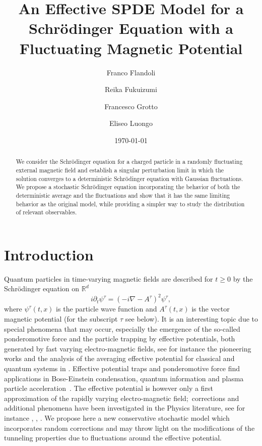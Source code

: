 \documentclass[a4paper,10pt]{amsart}
\title[Effective Models for Schr\"odinger Equations]{An Effective SPDE Model for a Schr\"odinger Equation with a Fluctuating Magnetic Potential}
\author[F. Flandoli]{Franco Flandoli}
\author[R. Fukuizumi]{Reika Fukuizumi}
\author[F. Grotto]{Francesco Grotto}
\author[E. Luongo]{Eliseo Luongo}
\date\today
\newcommand{\R}{\mathbb{R}}
\theoremstyle{remark}
\numberwithin{equation}{section}
\begin{document}
\begin{abstract}
    We consider the Schr\"odinger equation for a charged particle in a randomly fluctuating external magnetic field and establish a singular perturbation limit in which the solution converges to a deterministic Schr\"odinger equation with Gaussian fluctuations. We propose a stochastic Schr\"odinger equation incorporating the behavior of both the deterministic average and the fluctuations and show that it has the same limiting behavior as the original model, while providing a simpler way to study the distribution of relevant observables.
\end{abstract}

\maketitle

\section{Introduction}\label{sec:introduction}
Quantum particles in time-varying magnetic fields are described for $t \geq 0$ by the Schr\"{o}dinger equation on $\R^d$
\begin{equation*}
i\partial_{t}\psi^{\tau}=(-i\nabla-A^{\tau})^{2}\psi^{\tau},\tag{RMSE}%
\label{eq:rmse}%
\end{equation*}
where $\psi^{\tau}\left(  t,x\right)  $ is the particle wave function and $A^{\tau}\left(  t,x\right)  $ is the vector magnetic potential (for the subscript $\tau$ see below). 
It is an interesting topic due to special phenomena that may occur, especially the emergence of the so-called ponderomotive force and the particle trapping by effective potentials, both generated by fast varying electro-magnetic fields, see for instance the pioneering works \cite{Kap,KugPau,LovMeh,Pri} and the analysis of the averaging effective potential for classical and quantum systems in \cite{RhaGil}. Effective potential traps and ponderomotive force find applications in Bose-Einstein condensation, quantum information and plasma particle acceleration\ \cite{Leg,MonCam,RibPer}. The effective potential is however only a first approximation of the rapidly varying electro-magnetic field;\ corrections and additional phenomena have been investigated in the Physics literature, see for instance \cite{BesPen}, \cite{RidDav}, \cite{MulMor}. We propose here a new conservative stochastic model which incorporates random corrections and may throw light on the modifications of the tunneling properties due to fluctuations around the effective potential. 
\end{document}
